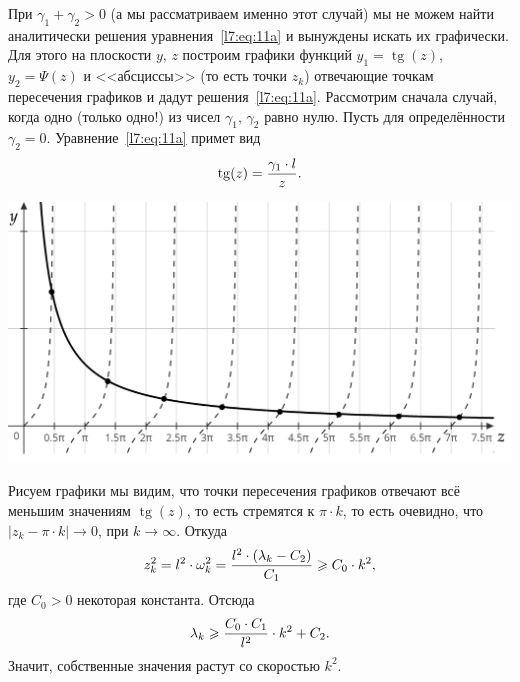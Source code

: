 \documentclass[12pt,a4paper,openany,fleqn]{book}
\DeclareMathOperator\Tg{tg}
\theoremstyle{definition}
\begin{document}
	\noindent При $\gamma_1+\gamma_2>0$ (а мы рассматриваем именно этот случай) мы не можем найти аналитически решения уравнения~\eqref{l7:eq:11a} и вынуждены искать их графически. Для этого на плоскости $y,\,z$ построим графики функций $y_1=\Tg(z)$, $y_2=\Psi(z)$ и  <<абсциссы>> (то есть точки $z_k$) отвечающие точкам пересечения графиков и дадут решения~\eqref{l7:eq:11a}. Рассмотрим сначала случай, когда одно (только одно!) из чисел $\gamma_1,\,\gamma_2$ равно нулю. Пусть для определённости $\gamma_2=0$. Уравнение~\eqref{l7:eq:11a} примет вид
	\begin{equation*}
		\hfill\Tg(z)=\dfrac{\gamma_1\cdot l}{z}.\hfill
	\end{equation*}
	\begin{center}
		\includegraphics[width=0.7\linewidth]{picture1}
	\end{center}
	Рисуем графики мы видим, что точки пересечения графиков отвечают всё меньшим значениям $\Tg(z)$, то есть стремятся к $\pi\cdot k$, то есть очевидно, что $|z_k-\pi\cdot  k|\to0$, при $k\to\infty$. Откуда
	\begin{equation*}
		\hfill z_k^2=l^2\cdot\omega_k^2=\dfrac{l^2\cdot(\lambda_k-C_2)}{C_1}\geqslant C_0\cdot k^2,\hfill
	\end{equation*}	
	где $C_0>0$ некоторая константа. Отсюда
	\begin{equation*}
		\hfill\lambda_k\geqslant\frac{C_0\cdot C_1}{l^2}\cdot k^2+C_2.\hfill
	\end{equation*}
	Значит, собственные значения растут со скоростью $k^2$.
	
\end{document}
